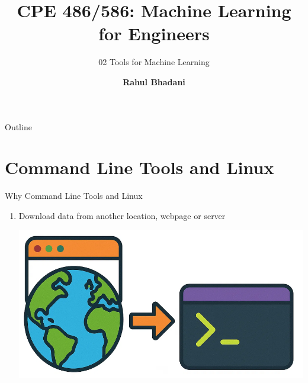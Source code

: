 \documentclass[aspectratio=169,xcolor=dvipsnames,svgnames,x11names,fleqn]{beamer}
\title[CPE 486/586: Machine Learning]{CPE 486/586: Machine Learning for Engineers} %
\subtitle{02 Tools for Machine Learning}
\author[Rahul Bhadani] {{\Large \textbf{Rahul Bhadani}}}
\institute[UAH] %
{
    Electrical \& Computer Engineering,  The University of Alabama in Huntsville
}
\date
\begin{document}
\begin{frame}
    \titlepage
\end{frame}

\begin{frame}{Outline}
    \backgroundtableofcontents
\end{frame}


\section{Command Line Tools and Linux}

\begin{frame}
    \sectionpage
\end{frame}

\begin{frame}{Why Command Line Tools and Linux}

\begin{enumerate}
    \item Download data from another location, webpage or server \begin{center}
\includegraphics[height=.4\textheight]{figures/cmd_line_download.png}
\end{center}
\end{enumerate}
    
\end{frame}
\end{document}

